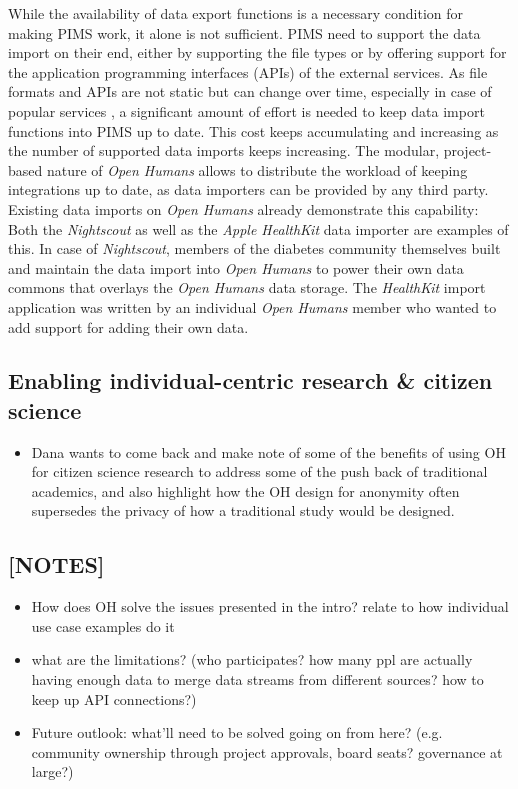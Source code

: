 \documentclass[a4paper,num-refs]{oup-contemporary}
\begin{document}
While the availability of data export functions is a necessary condition for making PIMS work, it alone is not sufficient. PIMS need to support the data import on their end, either by supporting the file types or by offering support for the application programming interfaces (APIs) of the external services. As file formats and APIs are not static but can change over time, especially in case of popular services \cite{Xavier2017}, a significant amount of effort is needed to keep data import functions into PIMS up to date. This cost keeps accumulating and increasing as the number of supported data imports keeps increasing. The modular, project-based nature of \textit{Open Humans} allows to distribute the workload of keeping integrations up to date, as data importers can be provided by any third party. Existing data imports on \textit{Open Humans} already demonstrate this capability: Both the \textit{Nightscout} as well as the \textit{Apple HealthKit} data importer are examples of this. In case of \textit{Nightscout}, members of the diabetes community themselves built and maintain the data import into \textit{Open Humans} to power their own data commons that overlays the \textit{Open Humans} data storage. The \textit{HealthKit} import application was written by an individual \textit{Open Humans} member who wanted to add support for adding their own data. 

\subsection{Enabling individual-centric research \& citizen science}
\begin{itemize}
    \item Dana wants to come back and make note of some of the benefits of using OH for citizen science research to address some of the push back of traditional academics, and also highlight how the OH design for anonymity often supersedes the privacy of how a traditional study would be designed.
\end{itemize}

\subsection{[NOTES]}
\begin{itemize}
    \item How does OH solve the issues presented in the intro? relate to how individual use case examples do it
    \item what are the limitations? (who participates? how many ppl are actually having enough data to merge data streams from different sources? how to keep up API connections?) 
    \item Future outlook: what'll need to be solved going on from here? (e.g. community ownership through project approvals, board seats? governance at large?) 
\end{itemize}
\end{document}
